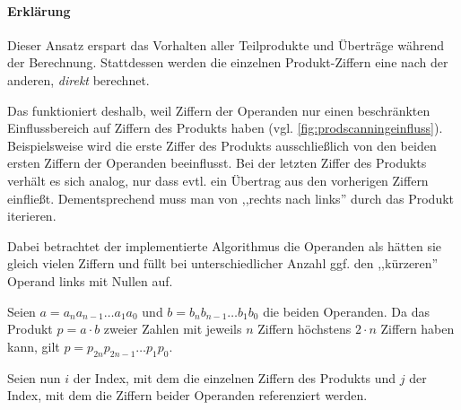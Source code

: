     \paragraph*{Erklärung}
    Dieser Ansatz erspart das Vorhalten aller Teilprodukte und Überträge während der Berechnung. Stattdessen werden die einzelnen Produkt-Ziffern eine nach der anderen, \emph{direkt} berechnet.

    Das funktioniert deshalb, weil Ziffern der Operanden nur einen beschränkten Einflussbereich auf Ziffern des Produkts haben (vgl. \autoref{fig:prodscanningeinfluss}). Beispielsweise wird die erste Ziffer des Produkts ausschließlich von den beiden ersten Ziffern der Operanden beeinflusst. Bei der letzten Ziffer des Produkts verhält es sich analog, nur dass evtl. ein Übertrag aus den vorherigen Ziffern einfließt. Dementsprechend muss man von ,,rechts nach links'' durch das Produkt iterieren.

    Dabei betrachtet der implementierte Algorithmus die Operanden als hätten sie gleich vielen Ziffern und füllt bei unterschiedlicher Anzahl ggf. den ,,kürzeren'' Operand links mit Nullen auf.

    Seien $a=a_{n}a_{n-1}\dots{}a_{1}a_{0}$ und $b=b_{n}b_{n-1}\dots{}b_{1}b_{0}$ die beiden Operanden.
    Da das Produkt $p = a \cdot b$ zweier Zahlen mit jeweils $n$ Ziffern höchstens $2 \cdot n$ Ziffern haben kann, gilt $p=p_{2n}p_{2 n-1}\dots{}p_{1}p_{0}$.

    Seien nun $i$ der Index, mit dem die einzelnen Ziffern des Produkts
    und $j$ der Index, mit dem die Ziffern beider Operanden referenziert werden.

